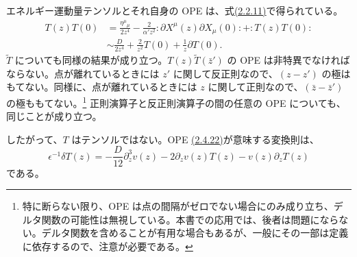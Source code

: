 
エネルギー運動量テンソルとそれ自身の OPE は、式\hyperref[eq:2.2.11]{(2.2.11)}で得られている。
\begin{equation}
\begin{aligned}
T(z)T(0)
&=\frac{\eta^\mu{}_\mu}{2z^4}
-\frac2{\alpha' z^2}:\partial X^\mu(z)\partial X_\mu(0):
+:T(z)T(0):\\
&\sim\frac D{2z^4}+\frac2{z^2}T(0)+\frac1z\partial T(0).
\end{aligned}
\tag{2.4.22}\label{eq:2.4.22}
\end{equation}
$\widetilde T$ についても同様の結果が成り立つ。$T(z)\widetilde T(\bar z')$ の OPE は非特異でなければならない。点が離れているときには $z'$ に関して反正則なので、$(z-z')$ の極はもてない。同様に、点が離れているときには $z$ に関して正則なので、$(\bar z-\bar z')$ の極ももてない。\footnote[4]{特に断らない限り、OPE は点の間隔がゼロでない場合にのみ成り立ち、デルタ関数の可能性は無視している。本書での応用では、後者は問題にならない。デルタ関数を含めることが有用な場合もあるが、一般にその一部は定義に依存するので、注意が必要である。}
正則演算子と反正則演算子の間の任意の OPE についても、同じことが成り立つ。

したがって、$T$ はテンソルではない。OPE \hyperref[eq:2.4.22]{(2.4.22)}が意味する変換則は、
\begin{equation}
\epsilon^{-1}\delta T(z)
=-\frac D{12}\partial_z^3v(z)
-2\partial_zv(z)T(z)-v(z)\partial_zT(z)
\tag{2.4.23}\label{eq:2.4.23}
\end{equation}
である。

